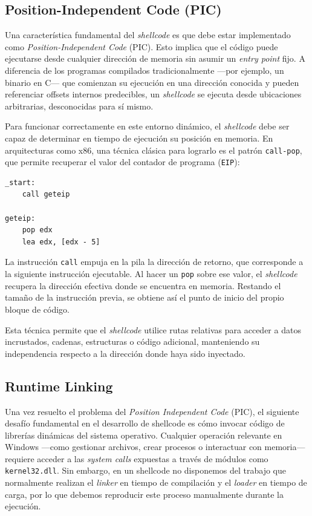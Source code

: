 \subsection{Position-Independent Code (PIC)}

Una característica fundamental del \textit{shellcode} es que debe estar implementado como \textit{Position-Independent Code} (PIC). Esto implica que el código puede ejecutarse desde cualquier dirección de memoria sin asumir un \textit{entry point} fijo. A diferencia de los programas compilados tradicionalmente —por ejemplo, un binario en C— que comienzan su ejecución en una dirección conocida y pueden referenciar offsets internos predecibles, un \textit{shellcode} se ejecuta desde ubicaciones arbitrarias, desconocidas para sí mismo.

Para funcionar correctamente en este entorno dinámico, el \textit{shellcode} debe ser capaz de determinar en tiempo de ejecución su posición en memoria. En arquitecturas como x86, una técnica clásica para lograrlo es el patrón \texttt{call-pop}, que permite recuperar el valor del contador de programa (\texttt{EIP}):

\begin{verbatim}
_start:
    call geteip

geteip:
    pop edx
    lea edx, [edx - 5]
\end{verbatim}

La instrucción \texttt{call} empuja en la pila la dirección de retorno, que corresponde a la siguiente instrucción ejecutable. Al hacer un \texttt{pop} sobre ese valor, el \textit{shellcode} recupera la dirección efectiva donde se encuentra en memoria. Restando el tamaño de la instrucción previa, se obtiene así el punto de inicio del propio bloque de código.  

Esta técnica permite que el \textit{shellcode} utilice rutas relativas para acceder a datos incrustados, cadenas, estructuras o código adicional, manteniendo su independencia respecto a la dirección donde haya sido inyectado.


\subsection{Runtime Linking}

Una vez resuelto el problema del \textit{Position Independent Code} (PIC), el siguiente desafío fundamental en el desarrollo de shellcode es cómo invocar código de librerías dinámicas del sistema operativo. Cualquier operación relevante en Windows —como gestionar archivos, crear procesos o interactuar con memoria— requiere acceder a las \textit{system calls} expuestas a través de módulos como \texttt{kernel32.dll}. Sin embargo, en un shellcode no disponemos del trabajo que normalmente realizan el \textit{linker} en tiempo de compilación y el \textit{loader} en tiempo de carga, por lo que debemos reproducir este proceso manualmente durante la ejecución.

